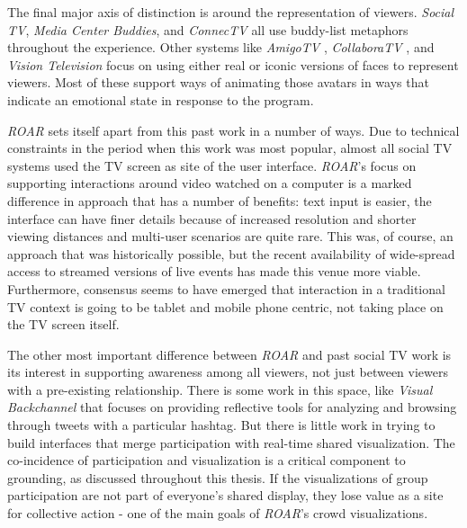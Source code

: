 The final major axis of distinction is around the representation of viewers. \emph{Social TV}\citep{harboe2007perceptions}, \emph{Media Center Buddies}\citep{regan2004media}, and \emph{ConnecTV} \citep{boertjes2008connectv} all use buddy-list metaphors throughout the experience. Other systems like \emph{AmigoTV} \citep{coppens2004amigotv}, \emph{CollaboraTV} \citep{harrison2007collaboratv}, and \emph{Vision Television}\citep{vt} focus on using either real or iconic versions of faces to represent viewers. Most of these support ways of animating those avatars in ways that indicate an emotional state in response to the program.

\emph{ROAR} sets itself apart from this past work in a number of ways. Due to technical constraints in the period when this work was most popular, almost all social TV systems used the TV screen as site of the user interface. \emph{ROAR}'s focus on supporting interactions around video watched on a computer is a marked difference in approach that has a number of benefits: text input is easier, the interface can have finer details because of increased resolution and shorter viewing distances and multi-user scenarios are quite rare. This was, of course, an approach that was historically possible, but the recent availability of wide-spread access to streamed versions of live events has made this venue more viable. Furthermore, consensus seems to have emerged that interaction in a traditional TV context is going to be tablet and mobile phone centric, not taking place on the TV screen itself.

The other most important difference between \emph{ROAR} and past social TV work is its interest in supporting awareness among all viewers, not just between viewers with a pre-existing relationship. There is some work in this space, like \emph{Visual Backchannel}\citep{Dork:2010fb} that focuses on providing reflective tools for analyzing and browsing through tweets with a particular hashtag. But there is little work in trying to build interfaces that merge participation with real-time shared visualization. The co-incidence of participation and visualization is a critical component to grounding, as discussed throughout this thesis. If the visualizations of group participation are not part of everyone's shared display, they lose value as a site for collective action - one of the main goals of \emph{ROAR}'s crowd visualizations.

